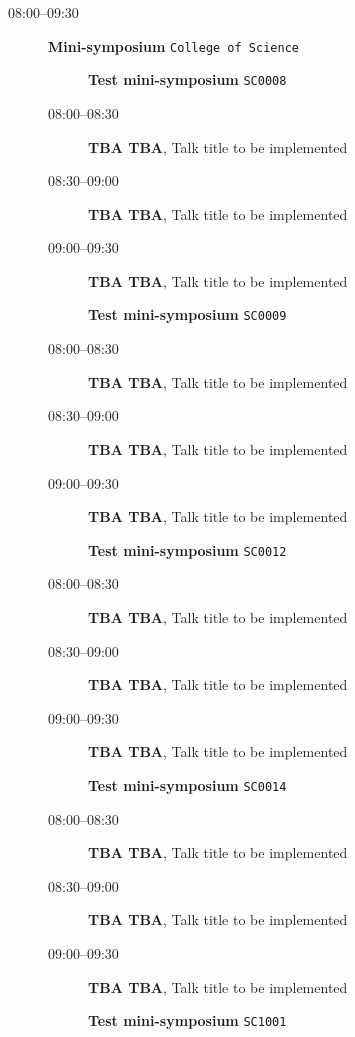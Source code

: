 \documentclass[ILAS2025-program.tex]{subfiles}
\begin{document}
    \begin{description}
    \item[08:00--09:30] \textbf{Mini-symposium} {\footnotesize\texttt{College of Science}}
    \begin{description}
    \item[] \textbf{Test mini-symposium} {\footnotesize\texttt{SC0008}}
    \item[08:00--08:30] \textbf{TBA TBA}, Talk title to be implemented
        \item[08:30--09:00] \textbf{TBA TBA}, Talk title to be implemented
        \item[09:00--09:30] \textbf{TBA TBA}, Talk title to be implemented
        \end{description}
    \begin{description}
    \item[] \textbf{Test mini-symposium} {\footnotesize\texttt{SC0009}}
    \item[08:00--08:30] \textbf{TBA TBA}, Talk title to be implemented
        \item[08:30--09:00] \textbf{TBA TBA}, Talk title to be implemented
        \item[09:00--09:30] \textbf{TBA TBA}, Talk title to be implemented
        \end{description}
    \begin{description}
    \item[] \textbf{Test mini-symposium} {\footnotesize\texttt{SC0012}}
    \item[08:00--08:30] \textbf{TBA TBA}, Talk title to be implemented
        \item[08:30--09:00] \textbf{TBA TBA}, Talk title to be implemented
        \item[09:00--09:30] \textbf{TBA TBA}, Talk title to be implemented
        \end{description}
    \begin{description}
    \item[] \textbf{Test mini-symposium} {\footnotesize\texttt{SC0014}}
    \item[08:00--08:30] \textbf{TBA TBA}, Talk title to be implemented
        \item[08:30--09:00] \textbf{TBA TBA}, Talk title to be implemented
        \item[09:00--09:30] \textbf{TBA TBA}, Talk title to be implemented
        \end{description}
    \begin{description}
    \item[] \textbf{Test mini-symposium} {\footnotesize\texttt{SC1001}}

\end{description}
\end{description}
\end{document}
